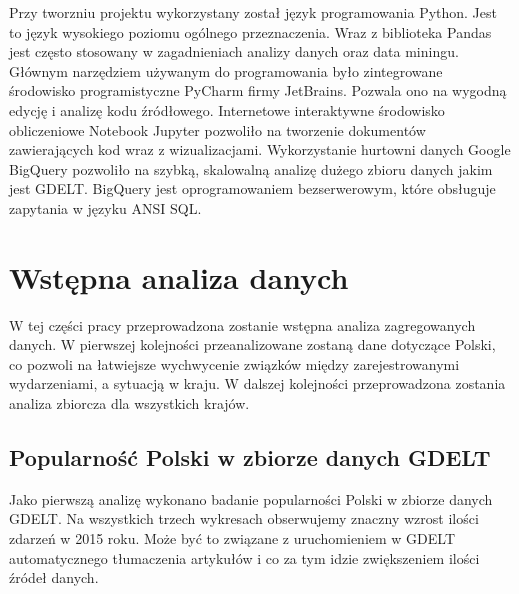 \documentclass[11pt]{report}
\begin{document}

    Przy tworzniu projektu wykorzystany został język programowania Python.
    Jest to język wysokiego poziomu ogólnego przeznaczenia.
    Wraz z biblioteka Pandas jest często stosowany w zagadnieniach analizy danych oraz data miningu.
    Głównym narzędziem używanym do programowania było zintegrowane środowisko programistyczne PyCharm firmy JetBrains.
    Pozwala ono na wygodną edycję i analizę kodu źródłowego.
    Internetowe interaktywne środowisko obliczeniowe Notebook Jupyter pozwoliło na tworzenie dokumentów zawierających kod wraz z wizualizacjami.
    Wykorzystanie hurtowni danych Google BigQuery pozwoliło na szybką, skalowalną analizę dużego zbioru danych jakim jest GDELT.
    BigQuery jest oprogramowaniem bezserwerowym, które obsługuje zapytania w języku ANSI SQL.


    \section{Wstępna analiza danych}
    W tej części pracy przeprowadzona zostanie wstępna analiza zagregowanych danych. W pierwszej kolejności przeanalizowane zostaną dane dotyczące Polski, co pozwoli na łatwiejsze wychwycenie związków między zarejestrowanymi wydarzeniami, a sytuacją w kraju.
    W dalszej kolejności przeprowadzona zostania analiza zbiorcza dla wszystkich krajów.

    \subsection{Popularność Polski w zbiorze danych GDELT}
    Jako pierwszą analizę wykonano badanie popularności Polski w zbiorze danych GDELT. Na wszystkich trzech wykresach obserwujemy znaczny wzrost ilości zdarzeń w 2015 roku. Może być to związane z uruchomieniem w GDELT automatycznego tłumaczenia artykułów i co za tym idzie zwiększeniem ilości źródeł danych.
\end{document}
